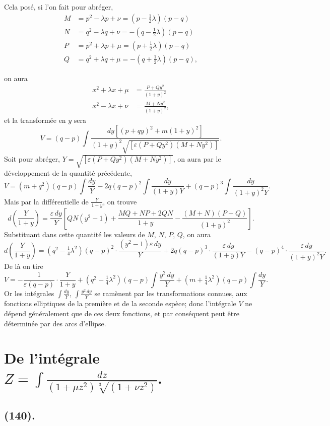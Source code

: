 \documentclass{article}
\begin{document}
Cela posé, si l'on fait pour abréger,
\[ \begin{aligned} M&=p^{2}-\lambda p+\nu=(p-\tfrac{1}{2}\lambda)(p-q)\\ N&=q^{2}-\lambda q+\nu=-(q-\tfrac{1}{2}\lambda)(p-q)\\ P&=p^{2}+\lambda p+\mu=(p+\tfrac{1}{2}\lambda)(p-q)\\ Q&=q^{2}+\lambda q+\mu=-(q+\tfrac{1}{2}\lambda)(p-q), \end{aligned} \]

on aura
\[ \begin{aligned} x^{2}+\lambda x+\mu&=\frac{P+Qy^{2}}{(1+y)^{2}}\\ x^{2}-\lambda x+\nu&=\frac{M+Ny^{2}}{(1+y)^{2}}, \end{aligned} \]
et la transformée en $y$ sera
\[ V=(q-p)\int\frac{dy[(p+qy)^{2}+m(1+y)^{2}]}{(1+y)^{2}\sqrt{[\varepsilon(P+Qy^{2})(M+Ny^{2})]}}. \]
Soit pour abréger, $Y=\sqrt{[\varepsilon(P+Qy^{2})(M+Ny^{2})]}$, on aura par le développement de la quantité précédente,
\[ V=(m+q^{2})(q-p)\int\frac{dy}{Y}-2q(q-p)^{2}\int\frac{dy}{(1+y)Y}+(q-p)^{3}\int\frac{dy}{(1+y)^{2}Y}. \]
Mais par la différentielle de $\frac{Y}{1+y}$, on trouve
\[ d\left(\frac{Y}{1+y}\right)=\frac{\varepsilon\,dy}{Y}\left[QN(y^{2}-1)+\frac{MQ+NP+2QN}{1+y}-\frac{(M+N)(P+Q)}{(1+y)^{2}}\right]. \]
Substituant dans cette quantité les valeurs de $M$, $N$, $P$, $Q$, on aura
\[ d\left(\frac{Y}{1+y}\right)=(q^{2}-\tfrac{1}{4}\lambda^{2})(q-p)^{2}\cdot\frac{(y^{2}-1)\varepsilon\,dy}{Y}+2q(q-p)^{3}\cdot\frac{\varepsilon\,dy}{(1+y)Y}-(q-p)^{4}\cdot\frac{\varepsilon\,dy}{(1+y)^{2}Y}. \]
De là on tire
\[ V=-\frac{1}{\varepsilon(q-p)}\cdot\frac{Y}{1+y}+(q^{2}-\tfrac{1}{4}\lambda^{2})(q-p)\int\frac{y^{2}\,dy}{Y}+(m+\tfrac{1}{4}\lambda^{2})(q-p)\int\frac{dy}{Y}. \]
Or les intégrales $\displaystyle\int\frac{dy}{Y}$, $\displaystyle\int\frac{y^{2}\,dy}{Y}$ se ramènent par les transformations connues, aux fonctions elliptiques de la première et de la seconde espèce; donc l'intégrale $V$ ne dépend généralement que de ces deux fonctions, et par conséquent peut être déterminée par des arcs d'ellipse.

\section*{De l'intégrale $Z=\displaystyle\int\frac{dz}{(1+\mu z^{2})\sqrt[3]{(1+\nu z^{2})}}$.}

\subsection*{(140).}
\end{document}
